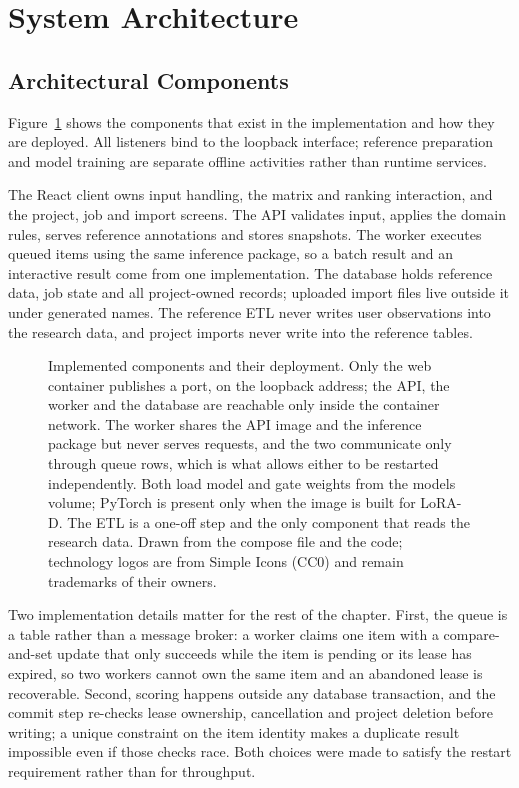 \section{System Architecture}
\subsection{Architectural Components}
Figure~\ref{fig:app-architecture} shows the components that exist in the implementation and how
they are deployed. All listeners bind to the loopback interface; reference preparation and model
training are separate offline activities rather than runtime services.

The React client owns input handling, the matrix and ranking interaction, and the project, job and
import screens. The API validates input, applies the domain rules, serves reference annotations and
stores snapshots. The worker executes queued items using the same inference package, so a batch
result and an interactive result come from one implementation. The database holds reference data,
job state and all project-owned records; uploaded import files live outside it under generated
names. The reference ETL never writes user observations into the research data, and project imports
never write into the reference tables.

\begin{figure}[htbp]
  \centering
  
  \caption[Implemented components and their deployment]{Implemented components and their deployment. Only the web container publishes a port,
  on the loopback address; the API, the worker and the database are reachable only inside the
  container network. The worker shares the API image and the inference package but never serves
  requests, and the two communicate only through queue rows, which is what allows either to be
  restarted independently. Both load model and gate weights from the models volume; PyTorch is
  present only when the image is built for LoRA-D. The ETL is a one-off step and the only component
  that reads the research data. Drawn from the compose file and the code; technology logos are
  from Simple Icons (CC0) and remain trademarks of their owners.}
  \label{fig:app-architecture}
\end{figure}


Two implementation details matter for the rest of the chapter. First, the queue is a table rather
than a message broker: a worker claims one item with a compare-and-set update that only succeeds
while the item is pending or its lease has expired, so two workers cannot own the same item and an
abandoned lease is recoverable. Second, scoring happens outside any database transaction, and the
commit step re-checks lease ownership, cancellation and project deletion before writing; a unique
constraint on the item identity makes a duplicate result impossible even if those checks race.
Both choices were made to satisfy the restart requirement rather than for throughput.

